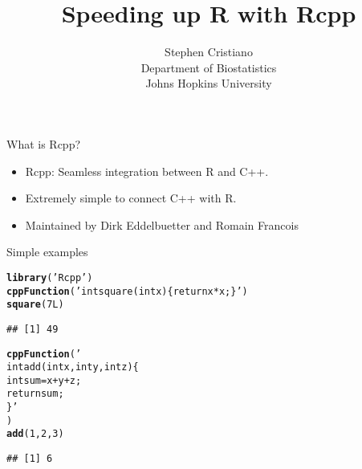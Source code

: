 \documentclass{beamer}\usepackage[]{graphicx}\usepackage[]{color}
\makeatletter
\newcommand{\hlnum}[1]{\textcolor[rgb]{0.686,0.059,0.569}{#1}}%
\newcommand{\hlstr}[1]{\textcolor[rgb]{0.192,0.494,0.8}{#1}}%
\newcommand{\hlstd}[1]{\textcolor[rgb]{0.345,0.345,0.345}{#1}}%
\newcommand{\hlkwd}[1]{\textcolor[rgb]{0.737,0.353,0.396}{\textbf{#1}}}%
\newenvironment{kframe}{%
 \def\at@end@of@kframe{}%
 \ifinner\ifhmode%
  \def\at@end@of@kframe{\end{minipage}}%
  \begin{minipage}{\columnwidth}%
 \fi\fi%
 \def\FrameCommand##1{\hskip\@totalleftmargin \hskip-\fboxsep
 \colorbox{shadecolor}{##1}\hskip-\fboxsep
     \hskip-\linewidth \hskip-\@totalleftmargin \hskip\columnwidth}%
 \MakeFramed {\advance\hsize-\width
   \@totalleftmargin\z@ \linewidth\hsize
   \@setminipage}}%
 {\par\unskip\endMakeFramed%
 \at@end@of@kframe}
\newenvironment{knitrout}{}{} %
\makeatother
\begin{document}
\title{Speeding up R with Rcpp}
\author{Stephen Cristiano \\ Department of Biostatistics \\ Johns Hopkins University}

\maketitle


\begin{frame}[fragile]{What is Rcpp?}
    \vspace{0.5em}
    \begin{itemize}\itemsep1em
        \item Rcpp: Seamless integration between R and C++.
        \item Extremely simple to connect C++ with R.
        \item Maintained by Dirk Eddelbuetter and Romain Francois
    \end{itemize}
\end{frame}

\begin{frame}[fragile]{Simple examples}
\begin{knitrout}\footnotesize
{}\color{fgcolor}\begin{kframe}
\begin{alltt}
\hlkwd{library}\hlstd{(}\hlstr{'Rcpp'}\hlstd{)}
\hlkwd{cppFunction}\hlstd{(}\hlstr{'int square(int x) \{ return x*x; \}'}\hlstd{)}
\hlkwd{square}\hlstd{(}\hlnum{7L}\hlstd{)}
\end{alltt}
\begin{verbatim}
## [1] 49
\end{verbatim}
\begin{alltt}
\hlkwd{cppFunction}\hlstd{(}\hlstr{'
            int add(int x, int y, int z) \{
                int sum = x + y + z;
                return sum;
            \}'}
            \hlstd{)}
\hlkwd{add}\hlstd{(}\hlnum{1}\hlstd{,} \hlnum{2}\hlstd{,} \hlnum{3}\hlstd{)}
\end{alltt}
\begin{verbatim}
## [1] 6
\end{verbatim}
\end{kframe}
\end{knitrout}
\end{frame}
\end{document}
